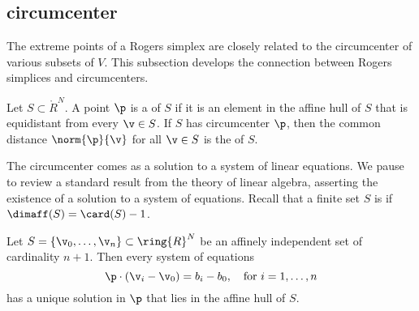 \subsection{circumcenter}

The extreme points of a Rogers simplex are closely related to the circumcenter
of various subsets of $V$.  This subsection develops the connection between
Rogers simplices and circumcenters.

\begin{definition} 
%
%
Let $S\subset\ring{R}^N$.  
A point $\p$ is a  of $S$ if it is an element
in the affine hull of $S$ that is equidistant from every $\v\in S$.  If $S$ has
circumcenter $\p$, then the common distance $\norm{\p}{\v}$ for all $\v\in S$
is the  of  $S$.
\end{definition}

The circumcenter comes as a solution to a system of linear equations.
We pause to review a standard result from the theory of linear
algebra, asserting the existence of a solution to a system of
equations.  Recall that a finite set $S$ is  if $\dimaff(S) = \card(S) -1$.  
%
%

\begin{lemma}\label{lemma:affine-system} 
  Let $S=\{\v_0,\ldots,\v_n\}\subset \ring{R}^N$ be an affinely
  independent set of cardinality $n+1$.  Then every system of
  equations
\[  
\p \cdot (\v_i - \v_0) = b_i-b_0,\quad \text{for } i=1,\ldots,n
\] 
has a unique solution in $\p$ that lies in the affine hull of $S$.
\end{lemma}

